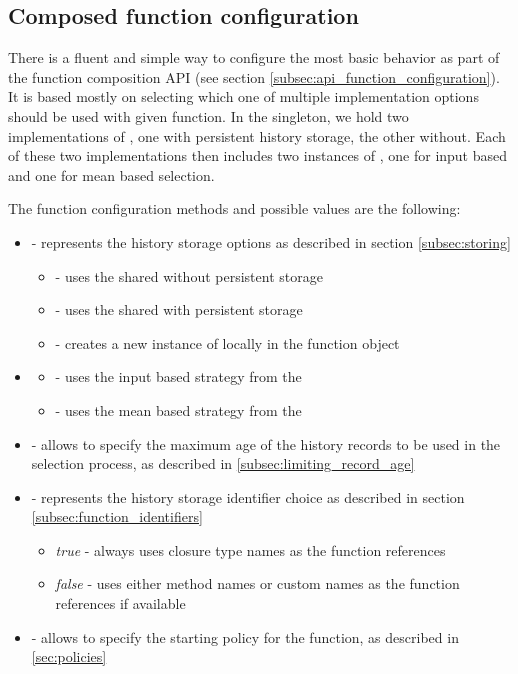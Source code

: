\subsection{Composed function configuration}

There is a fluent and simple way to configure the most basic behavior as part of the function composition API (see section \ref{subsec:api_function_configuration}). It is based mostly on selecting which one of multiple implementation options should be used with given function. In the  singleton, we hold two implementations of , one with persistent history storage, the other without. Each of these two implementations then includes two instances of  , one for input based and one for mean based selection.

The function configuration methods and possible values are the following:

\begin{itemize}
	\item {} - represents the history storage options as described in section \ref{subsec:storing}
	\begin{itemize}
		\item {} - uses the shared  without persistent storage
		\item {} - uses the shared  with persistent storage
		\item {} - creates a new instance of  locally in the function object
	\end{itemize}
\item {}
\begin{itemize}
	\item {} - uses the input based strategy from the 
	\item {} - uses the mean based strategy from the 
\end{itemize}
\item {} - allows to specify the maximum age of the history records to be used in the selection process, as described in \ref{subsec:limiting_record_age}
\item {} - represents the history storage identifier choice as described in section \ref{subsec:function_identifiers}
\begin{itemize}
	\item \textit{true} - always uses closure type names as the function references
	\item \textit{false} - uses either method names or custom names as the function references if available
\end{itemize}
\item {} - allows to specify the starting policy for the function, as described in \ref{sec:policies}
\end{itemize}

